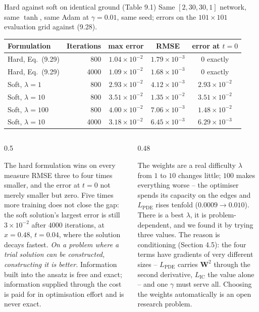 \documentclass[10pt,aspectratio=169]{beamer}
\begin{document}
\begin{frame}{Hard against soft on identical ground (Table 9.1)}
\scriptsize
Same $[2,30,30,1]$ network, same $\tanh$, same Adam at $\gamma=0.01$, same
seed; errors on the $101\times101$ evaluation grid against (9.28).
\begin{center}
\setlength{\tabcolsep}{5pt}
\begin{tabular}{@{}lrccc@{}}
\toprule
Formulation & Iterations & max error & RMSE & error at $t=0$\\
\midrule
Hard, Eq.~(9.29) & 800 & $1.04\times10^{-2}$ & $1.79\times10^{-3}$ & $0$ exactly\\
Hard, Eq.~(9.29) & 4000 & $1.09\times10^{-2}$ & $1.68\times10^{-3}$ & $0$ exactly\\
Soft, $\lambda=1$ & 800 & $2.93\times10^{-2}$ & $4.12\times10^{-3}$ & $2.93\times10^{-2}$\\
Soft, $\lambda=10$ & 800 & $3.51\times10^{-2}$ & $1.35\times10^{-2}$ & $3.51\times10^{-2}$\\
Soft, $\lambda=100$ & 800 & $4.00\times10^{-2}$ & $7.06\times10^{-3}$ & $1.48\times10^{-2}$\\
Soft, $\lambda=10$ & 4000 & $3.18\times10^{-2}$ & $6.45\times10^{-3}$ & $6.29\times10^{-3}$\\
\bottomrule
\end{tabular}
\end{center}
\begin{columns}[T]
\begin{column}{0.5\textwidth}
\begin{block}{The hard formulation wins on every measure}
\scriptsize
RMSE three to four times smaller, and the error at $t=0$ not merely smaller
but zero.  Five times more training does not close the gap: the soft
solution's largest error is still $3\times10^{-2}$ after $4000$ iterations,
at $x=0.48$, $t=0.04$, where the solution decays fastest.  \emph{On a
problem where a trial solution can be constructed, constructing it is
better.}  Information built into the ansatz is free and exact; information
supplied through the cost is paid for in optimisation effort and is never
exact.
\end{block}
\end{column}
\begin{column}{0.48\textwidth}
\begin{block}{The weights are a real difficulty}
\scriptsize
$\lambda$ from $1$ to $10$ changes little; $100$ makes everything worse --
the optimiser spends its capacity on the edges and $L_{\mathrm{PDE}}$ rises
tenfold ($0.0009\to0.010$).  There is a best $\lambda$, it is
problem-dependent, and we found it by trying three values.  The reason is
conditioning (Section 4.5): the four terms have gradients of very different
sizes -- $L_{\mathrm{PDE}}$ carries $\bm{W}^{2}$ through the second
derivative, $L_{\mathrm{IC}}$ the value alone -- and one $\gamma$ must
serve all.  Choosing the weights automatically is an open research problem.
\end{block}
\end{column}
\end{columns}
\end{frame}
\end{document}
